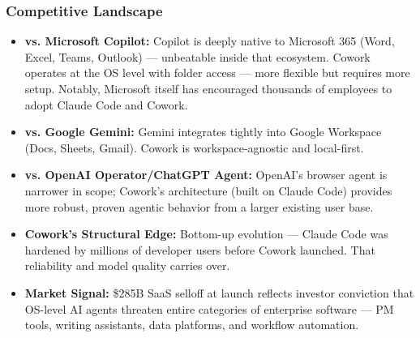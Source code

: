 \begin{frame}[fragile]\frametitle{Competitive Landscape}
  \begin{itemize}
    \item \textbf{vs. Microsoft Copilot:} Copilot is deeply native to Microsoft 365 (Word, Excel, Teams, Outlook) — unbeatable inside that ecosystem. Cowork operates at the OS level with folder access — more flexible but requires more setup. Notably, Microsoft itself has encouraged thousands of employees to adopt Claude Code and Cowork.
    \item \textbf{vs. Google Gemini:} Gemini integrates tightly into Google Workspace (Docs, Sheets, Gmail). Cowork is workspace-agnostic and local-first.
    \item \textbf{vs. OpenAI Operator/ChatGPT Agent:} OpenAI's browser agent is narrower in scope; Cowork's architecture (built on Claude Code) provides more robust, proven agentic behavior from a larger existing user base.
    \item \textbf{Cowork's Structural Edge:} Bottom-up evolution — Claude Code was hardened by millions of developer users before Cowork launched. That reliability and model quality carries over.
    \item \textbf{Market Signal:} \$285B SaaS selloff at launch reflects investor conviction that OS-level AI agents threaten entire categories of enterprise software — PM tools, writing assistants, data platforms, and workflow automation.
  \end{itemize}
\end{frame}


